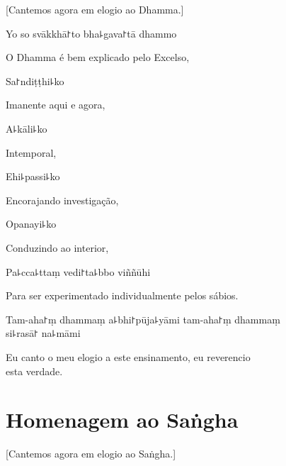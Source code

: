 \begin{english}
  [Cantemos agora em elogio ao Dhamma.]
\end{english}

Yo so svākkhā꜓to bha꜕gava꜓tā dhammo

\begin{english}
  O Dhamma é bem explicado pelo Excelso,
\end{english}

Sa꜓ndiṭṭhi꜕ko

\begin{english}
  Imanente aqui e agora,
\end{english}

A꜕kāli꜕ko

\begin{english}
  Intemporal,
\end{english}

Ehi꜕passi꜕ko

\begin{english}
  Encorajando investigação,
\end{english}

Opanayi꜕ko

\begin{english}
  Conduzindo ao interior,
\end{english}

Pa꜕cca꜕ttaṃ vedi꜓ta꜕bbo viññūhi

\begin{english}
  Para ser experimentado individualmente pelos sábios.
\end{english}

Tam-aha꜓ṃ dhammaṃ a꜕bhi꜓pūja꜕yāmi tam-aha꜓ṃ dhammaṃ \\si꜕rasā꜓ na꜕māmi

\begin{english}
  Eu canto o meu elogio a este ensinamento, eu reverencio\\ esta verdade.
\end{english}

\clearpage

\chapter{Homenagem ao Saṅgha}

\begin{leader}
\end{leader}

\begin{english}
  [Cantemos agora em elogio ao Saṅgha.]
\end{english}

